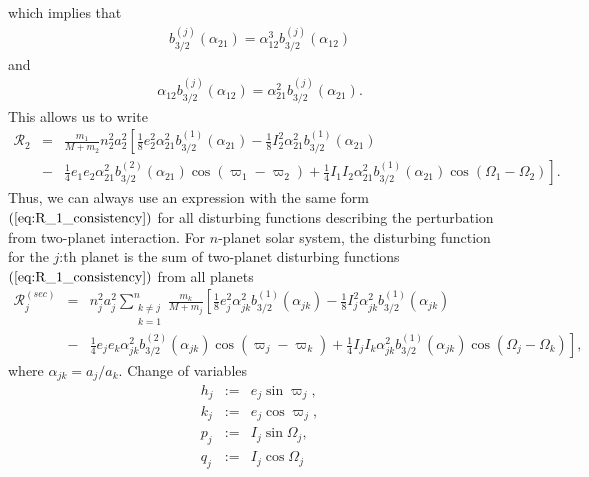 \documentclass [12pt, a4paper] {article}
\begin{document}
which implies that 
\begin {eqnarray}
    b_{3/2}^{(j)}(\alpha_{21}) = \alpha_{12}^3b_{3/2}^{(j)}(\alpha_{12})
\end {eqnarray}
and
\begin {eqnarray}
    \alpha_{12}b_{3/2}^{(j)}(\alpha_{12})
    =
    \alpha_{21}^2b_{3/2}^{(j)}(\alpha_{21}).
\end {eqnarray}
This allows us to write 
\begin {eqnarray}
    \mathcal{R}_2 
    &=& 
    \frac{m_1}{M + m_2}
    n_2^2a_2^2
    \left[
        \frac{1}{8}e_2^2\alpha_{21}^2 b_{3/2}^{(1)}(\alpha_{21})
        -
        \frac{1}{8}I_2^2\alpha_{21}^2 b_{3/2}^{(1)}(\alpha_{21})
    \right.
        \\\nonumber 
        &-& 
    \left.
        \frac{1}{4}e_1e_2\alpha_{21}^2 b_{3/2}^{(2)}(\alpha_{21})\cos(\varpi_1 - \varpi_2)
        +
        \frac{1}{4}I_1I_2\alpha_{21}^2 b_{3/2}^{(1)}(\alpha_{21})\cos(\Omega_1 - \Omega_2)
    \right].
\end {eqnarray}
Thus, we can always use an expression with the same form $(\ref{eq:R_1_consistency})$
for all disturbing functions 
describing the perturbation from two-planet interaction.
For $n$-planet solar system, the disturbing function for the $j$:th planet is the sum 
of two-planet disturbing functions $(\ref{eq:R_1_consistency})$ from all planets 
\begin {eqnarray}
    \label{eq:secular_n_body_dist}
    \mathcal{R}_j^{(sec)}
    &=& 
    n_j^2a_j^2
    \sum_{\substack{k\neq j\\k=1}}^n 
    \frac{m_k}{M + m_j}
    \left[
        \frac{1}{8}e_j^2\alpha_{jk}^2 b_{3/2}^{(1)}(\alpha_{jk})
        -
        \frac{1}{8}I_j^2\alpha_{jk}^2 b_{3/2}^{(1)}(\alpha_{jk})
    \right.
    \\\nonumber
    &-&
    \left.
        \frac{1}{4}e_je_k\alpha_{jk}^2b_{3/2}^{(2)}(\alpha_{jk})\cos(\varpi_j - \varpi_k)
        +
        \frac{1}{4}I_jI_k\alpha_{jk}^2b_{3/2}^{(1)}(\alpha_{jk})\cos(\Omega_j - \Omega_k)
    \right],
\end {eqnarray}
where $\alpha_{jk} = a_j/a_k$. Change of variables 
\begin {eqnarray}
    h_j 
    &:=&
    e_j\sin\varpi_j,
    \\
    k_j 
    &:=&
    e_j\cos\varpi_j,
    \\
    p_j 
    &:=&
    I_j\sin\Omega_j,
    \\
    q_j 
    &:=&
    I_j\cos\Omega_j
\end {eqnarray}
\end{document}
